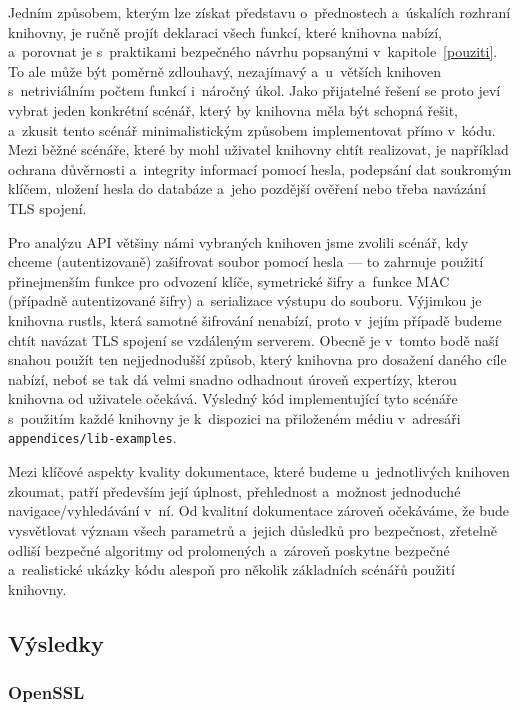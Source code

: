 Jedním způsobem, kterým lze získat představu o~přednostech a~úskalích rozhraní knihovny, je ručně projít deklaraci všech funkcí, které knihovna nabízí, a~porovnat je s~praktikami bezpečného návrhu popsanými v~kapitole~\ref{pouziti}. To ale může být poměrně zdlouhavý, nezajímavý a~u~větších knihoven s~netriviálním počtem funkcí i~náročný úkol. Jako přijatelné řešení se proto jeví vybrat jeden konkrétní scénář, který by knihovna měla být schopná řešit, a~zkusit tento scénář minimalistickým způsobem implementovat přímo v~kódu. Mezi běžné scénáře, které by mohl uživatel knihovny chtít realizovat, je například ochrana důvěrnosti a~integrity informací pomocí hesla, podepsání dat soukromým klíčem, uložení hesla do databáze a~jeho pozdější ověření nebo třeba navázání TLS spojení.

Pro analýzu API většiny námi vybraných knihoven jsme zvolili scénář, kdy chceme (autentizovaně) zašifrovat soubor pomocí hesla --- to zahrnuje použití přinejmenším funkce pro odvození klíče, symetrické šifry a~funkce MAC (případně autentizované šifry) a~serializace výstupu do souboru. Výjimkou je knihovna rustls, která samotné šifrování nenabízí, proto v~jejím případě budeme chtít navázat TLS spojení se vzdáleným serverem. Obecně je v~tomto bodě naší snahou použít ten nejjednodušší způsob, který knihovna pro dosažení daného cíle nabízí, neboť se tak dá velmi snadno odhadnout úroveň expertízy, kterou knihovna od uživatele očekává. Výsledný kód implementující tyto scénáře s~použitím každé knihovny je k~dispozici na přiloženém médiu v~adresáři \texttt{appendices/lib-examples}.

Mezi klíčové aspekty kvality dokumentace, které budeme u~jednotlivých knihoven zkoumat, patří především její úplnost, přehlednost a~možnost jednoduché navigace/vyhledávání v~ní. Od kvalitní dokumentace zároveň očekáváme, že bude vysvětlovat význam všech parametrů a~jejich důsledků pro bezpečnost, zřetelně odliší bezpečné algoritmy od prolomených a~zároveň poskytne bezpečné a~realistické ukázky kódu alespoň pro několik základních scénářů použití knihovny.

\subsection{Výsledky}

\subsubsection*{OpenSSL}

